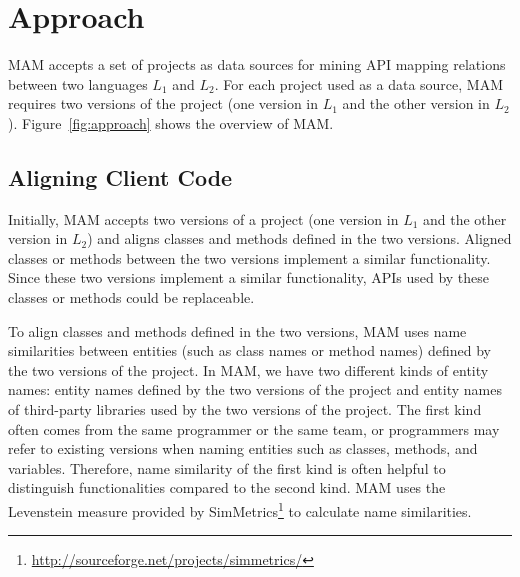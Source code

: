 \section{Approach}
\label{sec:approach}

MAM accepts a set of projects as data sources for mining API
mapping relations between two languages $L_1$ and $L_2$.
For each project used as a data source,
MAM requires two versions of the project (one
version in $L_1$ and the other version in $L_2$).
Figure~\ref{fig:approach} shows the overview of MAM.




\subsection{Aligning Client Code}
\label{sec:approach:acc}

Initially, MAM accepts two versions of a project (one version in
$L_1$ and the other version in $L_2$) and aligns classes and methods
defined in the two versions. Aligned classes or methods
between the two versions implement a similar functionality. Since these two versions
implement a similar functionality, APIs used by these classes or methods could be
replaceable.

To align classes and methods defined in the two versions, MAM uses
name similarities between entities (such as class names or method
names) defined by the two versions of the project. In MAM,
we have two different kinds of entity names: entity names defined by
the two versions of the project and entity names of third-party
libraries used by the two versions of the project. The first kind
often comes from the same programmer or the same team, or
programmers may refer to existing versions when naming entities such
as classes, methods, and variables. Therefore, name similarity of
the first kind is often helpful to distinguish functionalities
compared to the second kind. MAM uses the Levenstein
measure provided by
SimMetrics\footnote{\url{http://sourceforge.net/projects/simmetrics/}}
to calculate name similarities.


